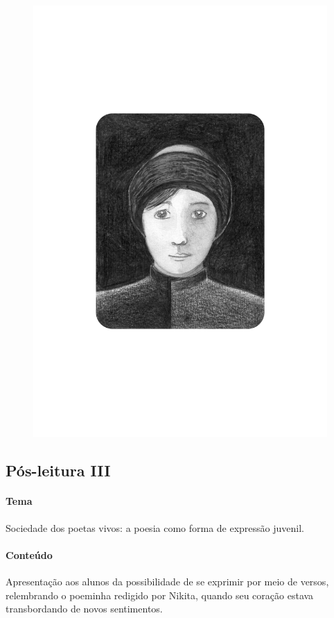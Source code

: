 \documentclass{article}
\begin{document}
\begin{figure}[ht!]
\includegraphics[width=\textwidth]{./images/PNLD0049-10.png}
\end{figure}

\subsection{Pós-leitura III}

\paragraph{Tema} Sociedade dos poetas vivos: a poesia como forma de expressão
juvenil.


\paragraph{Conteúdo}
Apresentação aos alunos da possibilidade de se exprimir por meio de
versos, relembrando o poeminha redigido por Nikita, quando seu coração
estava transbordando de novos sentimentos.
\end{document}
